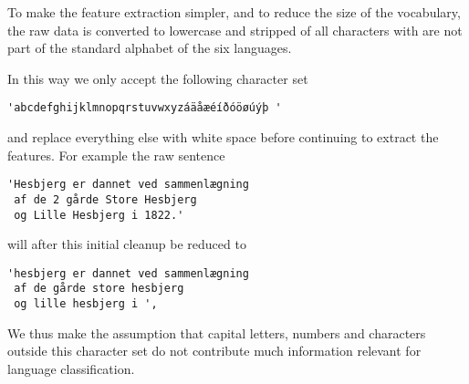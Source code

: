 To make the feature extraction simpler, and to reduce the size of the vocabulary, the raw data is converted to lowercase and stripped of all characters with are not part of the standard alphabet of the six languages.

In this way we only accept the following character set
\begin{verbatim}
'abcdefghijklmnopqrstuvwxyzáäåæéíðóöøúýþ '
\end{verbatim}
and replace everything else with white space before continuing to extract the features.
For example the raw sentence
\begin{verbatim}
'Hesbjerg er dannet ved sammenlægning
 af de 2 gårde Store Hesbjerg
 og Lille Hesbjerg i 1822.'
\end{verbatim}
will after this initial cleanup be reduced to
\begin{verbatim}
'hesbjerg er dannet ved sammenlægning
 af de gårde store hesbjerg
 og lille hesbjerg i ',
\end{verbatim}

We thus make the assumption that capital letters, numbers and characters outside this character set do not contribute much information relevant for language classification.
